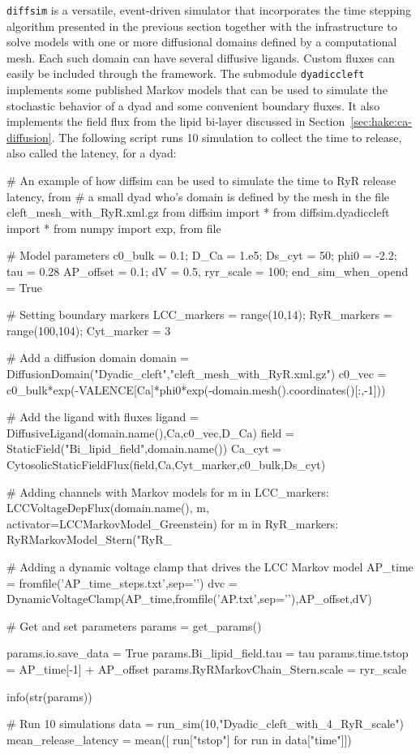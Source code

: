 \texttt{diffsim} is a versatile, event-driven simulator that
incorporates the time stepping algorithm presented in the previous
section together with the infrastructure to solve models with one or
more diffusional domains defined by a computational mesh. Each such
domain can have several diffusive ligands. Custom fluxes can easily be
included through the framework. The submodule \texttt{dyadiccleft}
implements some published Markov models that can be used to simulate
the stochastic behavior of a dyad and some convenient boundary
fluxes. It also implements the field flux from the lipid bi-layer
discussed in Section~\ref{sec:hake:ca-diffusion}. The following script
runs 10 simulation to collect the time to release, also called the
latency, for a dyad:
\begin{python}
# An example of how diffsim can be used to simulate the time to RyR release latency, from
# a small dyad who's domain is defined by the mesh in the file cleft_mesh_with_RyR.xml.gz
from diffsim import *
from diffsim.dyadiccleft import *
from numpy import exp, from file

# Model parameters
c0_bulk = 0.1; D_Ca = 1.e5; Ds_cyt = 50; phi0 = -2.2; tau = 0.28
AP_offset = 0.1; dV = 0.5, ryr_scale = 100; end_sim_when_opend = True

# Setting boundary markers
LCC_markers = range(10,14); RyR_markers = range(100,104); Cyt_marker = 3

# Add a diffusion domain
domain = DiffusionDomain("Dyadic_cleft","cleft_mesh_with_RyR.xml.gz")
c0_vec = c0_bulk*exp(-VALENCE[Ca]*phi0*exp(-domain.mesh().coordinates()[:,-1]))

# Add the ligand with fluxes
ligand = DiffusiveLigand(domain.name(),Ca,c0_vec,D_Ca)
field  = StaticField("Bi_lipid_field",domain.name())
Ca_cyt = CytosolicStaticFieldFlux(field,Ca,Cyt_marker,c0_bulk,Ds_cyt)

# Adding channels with Markov models
for m in LCC_markers:
    LCCVoltageDepFlux(domain.name(), m, activator=LCCMarkovModel_Greenstein)
for m in RyR_markers:
    RyRMarkovModel_Stern("RyR_%

# Adding a dynamic voltage clamp that drives the LCC Markov model
AP_time = fromfile('AP_time_steps.txt',sep='\n')
dvc = DynamicVoltageClamp(AP_time,fromfile('AP.txt',sep='\n'),AP_offset,dV)

# Get and set parameters
params = get_params()

params.io.save_data = True
params.Bi_lipid_field.tau = tau
params.time.tstop = AP_time[-1] + AP_offset
params.RyRMarkovChain_Stern.scale = ryr_scale

info(str(params))

# Run 10  simulations
data = run_sim(10,"Dyadic_cleft_with_4_RyR_scale")
mean_release_latency = mean([ run["tstop"] for run in data["time"]])
\end{python}
